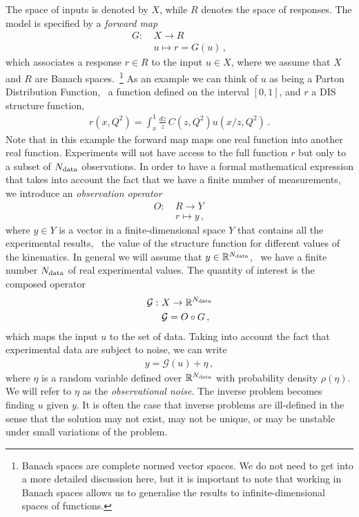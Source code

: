 The space of inputs is denoted by $X$, while $R$ denotes the space of responses.
The model is specified by a {\em forward map}
\begin{align}
  \label{eq:ForwardMap}
  G : ~& X \to R \nonumber \\
      & u \mapsto r=G(u) \, ,
\end{align}
which associates a response $r \in R$ to the input $u \in X$, where we assume
that $X$ and $R$ are Banach spaces.~\footnote{Banach spaces are complete normed
vector spaces. We do not need to get into a more detailed discussion here, but
it is important to note that working in Banach spaces allows us to generalise
the results to infinite-dimensional spaces of functions.} As an example we can
think of $u$ as being a Parton Distribution Function, \ie\ a function defined on
the interval $[0,1]$, and $r$ a DIS structure function,
\begin{align}
  \label{eq:DISExample}
  r(x,Q^2) = \int_x^1 \frac{dz}{z}\, C(z,Q^2) u(x/z,Q^2)\, .
\end{align}
Note that in this example the forward map maps one real function into another
real function. Experiments will not have access to the full function $r$ but
only to a subset of $N_{\rm data}$ observations. In order to have a formal
mathematical expression that takes into account the fact that we have a finite
number of measurements, we introduce an {\em observation operator}
\begin{align}
  O : ~& R \to Y \nonumber \\
       & r \mapsto y \, ,
\end{align}
where $y \in Y$ is a vector in a finite-dimensional space $Y$ that contains all
the experimental results, \eg\ the value of the structure function for different
values of the kinematics. In general we will assume that $y \in
\mathbb{R}^{N_{\rm data}}$, \ie\ we have a finite number $N_{\rm data}$ of real experimental
values. The quantity of interest is the composed operator
\begin{align}
  \mathcal{G} : ~& X \to \mathbb{R}^{N_{\rm data}} \nonumber \\
                 & \mathcal{G} = O \circ G\, ,
\end{align}
which maps the input $u$ to the set of data. Taking into account the fact that
experimental data are subject to noise, we can write
\begin{align}
  \label{eq:NoisyInverseProblem}
  y = \mathcal{G}(u) + \eta\, ,
\end{align}
where $\eta$ is a random variable defined over $\mathbb{R}^{N_{\rm data}}$
with probability density $\rho(\eta)$. We will refer to $\eta$ as the
{\em observational noise}. The inverse problem becomes finding $u$
given $y$. It is often the case that inverse problems are ill-defined
in the sense that the solution may not exist, may not be unique, or
may be unstable under small variations of the problem. 

